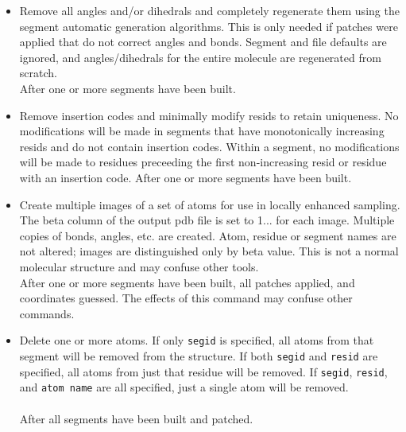 \begin{itemize}
\item {}
{Remove all angles and/or dihedrals and completely regenerate them using
the segment automatic generation algorithms.  This is only needed if
patches were applied that do not correct angles and bonds.  Segment and
file defaults are ignored, and angles/dihedrals for the entire molecule
are regenerated from scratch.}
{\\
}
{After one or more segments have been built.}

\item {}
{Remove insertion codes and minimally modify resids to retain uniqueness.
No modifications will be made in segments that have monotonically increasing resids
and do not contain insertion codes.
Within a segment, no modifications will be made to residues preceeding the
first non-increasing resid or residue with an insertion code.}
{}
{After one or more segments have been built.}

\item {}
{Create multiple images of a set of atoms for use in locally enhanced sampling.  The beta column of the output pdb file is set to 1... for each image.  Multiple copies of bonds, angles, etc. are created.  Atom, residue or segment names are not altered; images are distinguished only by beta value.  This is not a normal molecular structure and may confuse other tools.}
{\\
}
{After one or more segments have been built, all patches applied, and coordinates guessed.  The effects of this command may confuse other commands.}

\item {}
{Delete one or more atoms.  If only {\tt segid} is specified, all atoms from
that segment will be removed from the structure.  If both {\tt segid} and
{\tt resid} are specified, all atoms from just that residue will be removed.
If {\tt segid}, {\tt resid}, and {\tt atom name} are all specified, just a
single atom will be removed.}
{\\
\\
}
{After all segments have been built and patched.}


\end{itemize}
